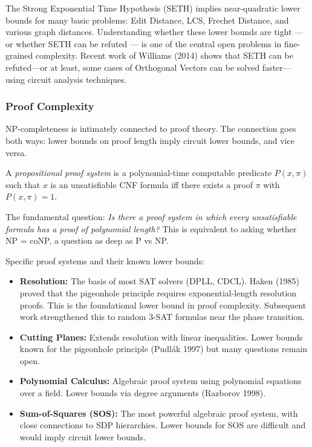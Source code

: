 The Strong Exponential Time Hypothesis (SETH) implies near-quadratic lower bounds for many basic problems: Edit Distance, LCS, Frechet Distance, and various graph distances. Understanding whether these lower bounds are tight — or whether SETH can be refuted — is one of the central open problems in fine-grained complexity. Recent work of Williams (2014) shows that SETH can be refuted---or at least, some cases of Orthogonal Vectors can be solved faster---using circuit analysis techniques.

\subsubsection*{Proof Complexity}
\label{sec:np:proofcomplexity}

NP-completeness is intimately connected to proof theory. The connection goes both ways: lower bounds on proof length imply circuit lower bounds, and vice versa.

\begin{definition}
A \emph{propositional proof system} is a polynomial-time computable predicate $P(x, \pi)$ such that $x$ is an unsatisfiable CNF formula iff there exists a proof $\pi$ with $P(x,\pi) = 1$.
\end{definition}

The fundamental question: \emph{Is there a proof system in which every unsatisfiable formula has a proof of polynomial length?} This is equivalent to asking whether NP = coNP, a question as deep as P vs NP.

Specific proof systems and their known lower bounds:
\begin{itemize}
\item \textbf{Resolution:} The basis of most SAT solvers (DPLL, CDCL). Haken (1985) proved that the pigeonhole principle requires exponential-length resolution proofs. This is the foundational lower bound in proof complexity. Subsequent work strengthened this to random 3-SAT formulas near the phase transition.
\item \textbf{Cutting Planes:} Extends resolution with linear inequalities. Lower bounds known for the pigeonhole principle (Pudlák 1997) but many questions remain open.
\item \textbf{Polynomial Calculus:} Algebraic proof system using polynomial equations over a field. Lower bounds via degree arguments (Razborov 1998).
\item \textbf{Sum-of-Squares (SOS):} The most powerful algebraic proof system, with close connections to SDP hierarchies. Lower bounds for SOS are difficult and would imply circuit lower bounds.
\end{itemize}

